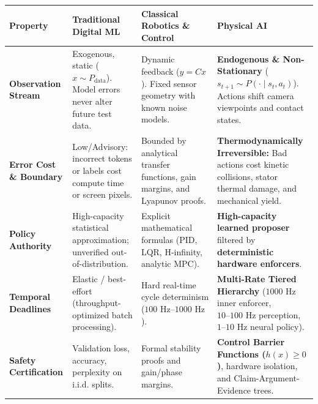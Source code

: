 \documentclass[
  10pt,
  letterpaper,
  twoside,
  openright,
  numbers=noenddot,
  headings=standardclasses
]{scrbook}
\begin{document}
{\def\LTcaptype{none} %
\begin{longtable}[]{@{}
  >{\raggedright\arraybackslash}p{}
  >{\raggedright\arraybackslash}p{}
  >{\raggedright\arraybackslash}p{}
  >{\raggedright\arraybackslash}p{}@{}}
\toprule\noalign{}
\begin{minipage}[b]{\linewidth}\raggedright
Property
\end{minipage} & \begin{minipage}[b]{\linewidth}\raggedright
Traditional Digital ML
\end{minipage} & \begin{minipage}[b]{\linewidth}\raggedright
Classical Robotics \& Control
\end{minipage} & \begin{minipage}[b]{\linewidth}\raggedright
Physical AI
\end{minipage} \\
\midrule\noalign{}
\endhead
\bottomrule\noalign{}
\endlastfoot
\textbf{Observation Stream} & Exogenous, static
(\(x \sim P_{\text{data}}\)). Model errors never alter future test data.
& Dynamic feedback (\(y = Cx\)). Fixed sensor geometry with known noise
models. & \textbf{Endogenous \& Non-Stationary}
(\(s_{t+1} \sim P(\cdot \mid s_t, a_t)\)). Actions shift camera
viewpoints and contact states. \\
\textbf{Error Cost \& Boundary} & Low/Advisory: incorrect tokens or
labels cost compute time or screen pixels. & Bounded by analytical
transfer functions, gain margins, and Lyapunov proofs. &
\textbf{Thermodynamically Irreversible:} Bad actions cost kinetic
collisions, stator thermal damage, and mechanical yield. \\
\textbf{Policy Authority} & High-capacity statistical approximation;
unverified out-of-distribution. & Explicit mathematical formulas (PID,
LQR, H-infinity, analytic MPC). & \textbf{High-capacity learned
proposer} filtered by \textbf{deterministic hardware enforcers}. \\
\textbf{Temporal Deadlines} & Elastic / best-effort
(throughput-optimized batch processing). & Hard real-time cycle
determinism (\(100\text{ Hz}\text{--}1000\text{ Hz}\)). &
\textbf{Multi-Rate Tiered Hierarchy} (\(1000\text{ Hz}\) inner enforcer,
\(10\text{--}100\text{ Hz}\) perception, \(1\text{--}10\text{ Hz}\)
neural policy). \\
\textbf{Safety Certification} & Validation loss, accuracy, perplexity on
i.i.d. splits. & Formal stability proofs and gain/phase margins. &
\textbf{Control Barrier Functions (\(h(x) \ge 0\))}, hardware isolation,
and Claim-Argument-Evidence trees. \\
\end{longtable}
}
\end{document}
